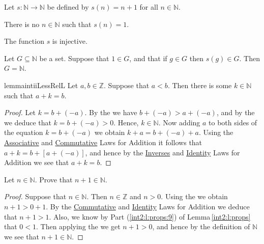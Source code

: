 \begin{theorem} %
	\label{int2:t:peano}
	Let $s: \mathbb{N} \to \mathbb{N}$ be defined by $s(n) = n + 1$ for all $n \in \mathbb{N}$.
	\begin{lenumerate}
		\item There is no $n \in \mathbb{N}$ such that $s(n) = 1$.
		\item The function $s$ is injective.
		\item Let $G \subseteq \mathbb{N}$ be a set. Suppose that $1 \in G$, and that if $g \in G$ then $s(g) \in G$. Then
		      $G = \mathbb{N}$. \label{int2:t:peano:induction}
	\end{lenumerate}
\end{theorem}


\Newpage
\begin{restatable}{lemma}{intiiLessRelL} %
	\label{int2:l:less_relation}
	Let $a, b \in \mathbb{Z}$. Suppose that $a < b$. Then there is some $k \in \mathbb{N}$ such that $a + k = b$.
\end{restatable}

\begin{proof}
	Let $k = b + (-a)$. By the  we have $b + (-a) > a + (-a)$, and by the  we deduce that $k = b + (-a) > 0$. Hence, $k \in \mathbb{N}$. Now adding $a$ to both sides of the equation $k = b + (-a)$ we obtain $k + a = b + (-a) + a$. Using the \hyperref[int2:d:oid:associative_add]{Associative} and \hyperref[int2:d:oid:commutative_add]{Commutative} Laws for Addition it follows that $a + k = b + [a + (-a)]$, and hence by the \hyperref[int2:d:oid:inverses_add]{Inverses} and \hyperref[int2:d:oid:identity_add]{Identity} Laws for Addition we see that $a + k = b$.
\end{proof}


\addtocounter{exercise}{1}
\Newpage
\begin{exercise} %
	Let $n \in \mathbb{N}$. Prove that $n + 1 \in \mathbb{N}$.
\end{exercise}

\begin{proof}
	Suppose that $n \in \mathbb{N}$. Then $n \in \mathbb{Z}$ and $n > 0$. Using the  we obtain $n + 1 > 0 + 1$. By the \hyperref[int2:d:oid:commutative_add]{Commutative} and \hyperref[int2:d:oid:identity_add]{Identity} Laws for Addition we deduce that $n + 1 > 1$. Also, we know by Part (\ref{int2:l:props:9}) of Lemma\,\ref{int2:l:props} that $0 < 1$. Then applying the  we get $n + 1 > 0$, and hence by the definition of $\mathbb{N}$ we see that $n + 1 \in \mathbb{N}$.
\end{proof}


